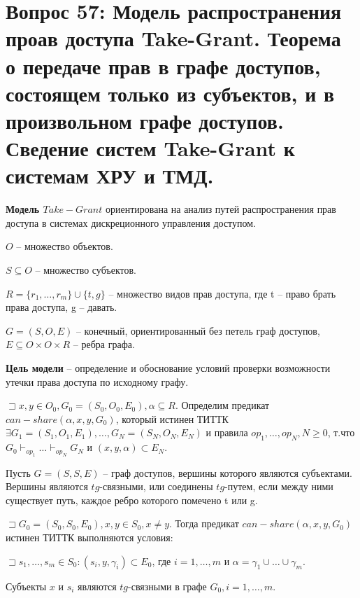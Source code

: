 \section{Вопрос 57: Модель распространения проав доступа Take-Grant. Теорема о передаче прав в графе доступов, состоящем только из субъектов, и в произвольном графе доступов. Сведение систем Take-Grant к системам ХРУ и ТМД.}

\textbf{Модель $Take-Grant$} ориентирована на анализ путей распространения прав доступа в системах дискреционного управления доступом.

\begin{defs}
	\begin{enumerate*}
		\item $ O $ -- множество объектов.
		\item $S \subseteq O$ -- множество субъектов.
		\item $ R = \{ r_1, \ldots, r_m \} \cup \{ t, g \} $ -- множество видов прав доступа, где t -- право брать права доступа, g -- давать.
		\item $ G = (S, O, E) $ -- конечный, ориентированный без петель граф доступов, $E \subseteq O \times O \times R $ -- ребра графа.
	\end{enumerate*}
\end{defs}

\textbf{Цель модели} -- определение и обоснование условий проверки возможности утечки права доступа по исходному графу.

\begin{defs}
	$ \sqsupset x,y \in O_0, G_0 = (S_0, O_0, E_0), \alpha   \subseteq R$. Определим предикат
	$can-share(\alpha, x, y, G_0)$, который истинен ТИТТК $ \exists G_1 = (S_1, O_1, E_1), \ldots,
	G_N = (S_N, O_N, E_N)$ и правила $op_1, \ldots, op_N, N \geqslant 0$, т.что
	$G_0 \vdash_{op_1} \ldots \vdash_{op_N} G_N $ и $(x, y, \alpha) \subset E_N$.
\end{defs}

\begin{defs}[$tg$-связность]
	Пусть $G = (S, S, E)$ -- граф доступов, вершины которого являются субъектами. Вершины являются $tg$-связными, или
	соединены $tg$-путем, если между ними существует путь, каждое ребро которого помечено t или g.
\end{defs}

\begin{proofs}
	$\sqsupset  G_0 = (S_0, S_0, E_0), x,y \in S_0, x \neq y$. Тогда предикат $can-share(\alpha, x, y, G_0)$
	истинен ТИТТК выполняются условия:
	\begin{enumerate*}
		\item $ \sqsupset s_1, \ldots, s_m \in S_0 : (s_i, y, \gamma_i) \subset E_0 $, где
		$ i = 1, \ldots, m $ и $ \alpha = \gamma_1 \cup \ldots \cup \gamma_m $.
		\item Субъекты $ x $ и $ s_i $ являются $tg$-связными в графе $G_0, i = 1, \ldots, m $.
	\end{enumerate*}
\end{proofs}

